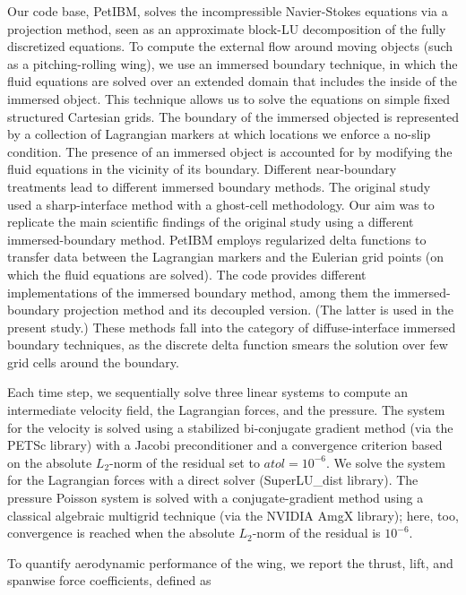 Our code base, PetIBM, solves the incompressible Navier-Stokes equations via a projection method, seen as an approximate block-LU decomposition of the fully discretized equations.\supercite{perot_1993}
To compute the external flow around moving objects (such as a pitching-rolling wing), we use an immersed boundary technique,
in which the fluid equations are solved over an extended domain that includes the inside of the immersed object.
This technique allows us to solve the equations on simple fixed structured Cartesian grids.
The boundary of the immersed objected is represented by a collection of Lagrangian markers at which locations we enforce a no-slip condition.
The presence of an immersed object is accounted for by modifying the fluid equations in the vicinity of its boundary.
Different near-boundary treatments lead to different immersed boundary methods.
The original study used a sharp-interface method with a ghost-cell methodology.\supercite{mittal_et_al_2008}
Our aim was to replicate the main scientific findings of the original study using a different immersed-boundary method.
PetIBM employs regularized delta functions to transfer data between the Lagrangian markers and the Eulerian grid points (on which the fluid equations are solved).
The code provides different implementations of the immersed boundary method, among them the immersed-boundary projection method\supercite{taira_colonius_2007} and its decoupled version.\supercite{li_et_al_2016}
(The latter is used in the present study.)
These methods fall into the category of diffuse-interface immersed boundary techniques, as the discrete delta function smears the solution over few grid cells around the boundary.

Each time step, we sequentially solve three linear systems to compute an intermediate velocity field, the Lagrangian forces, and the pressure.
The system for the velocity is solved using a stabilized bi-conjugate gradient method (via the PETSc library) with a Jacobi preconditioner and a convergence criterion based on the absolute $L_2$-norm of the residual set to $atol = 10^{-6}$.
We solve the system for the Lagrangian forces with a direct solver (SuperLU\_dist library).
The pressure Poisson system is solved with a conjugate-gradient method using a classical algebraic multigrid technique (via the NVIDIA AmgX library); here, too, convergence is reached when the absolute $L_2$-norm of the residual is $10^{-6}$.

To quantify aerodynamic performance of the wing, we report the thrust, lift, and spanwise force coefficients, defined as

